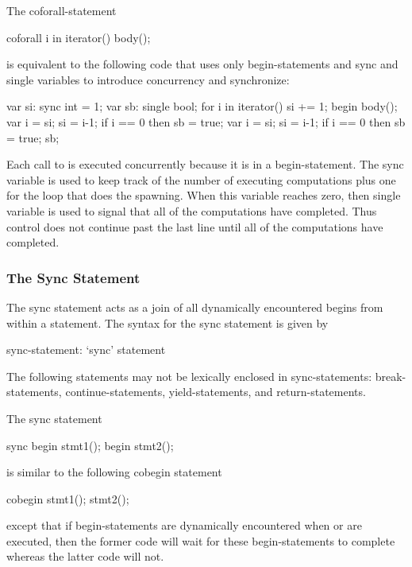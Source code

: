 \begin{example}
The coforall-statement
\begin{chapel}
coforall i in iterator() {
  body();
}
\end{chapel}
is equivalent to the following code that uses only begin-statements
and sync and single variables to introduce concurrency and
synchronize:
\begin{chapel}
var si: sync int = 1;
var sb: single bool;
for i in iterator() {
  si += 1;
  begin {
    body();
    var i = si;
    si = i-1;
    if i == 0 then sb = true;
  }
}
var i = si;
si = i-1;
if i == 0 then sb = true;
sb;
\end{chapel}
Each call to  is executed concurrently because it is in a
begin-statement.  The sync variable  is used to keep track of
the number of executing computations plus one for the loop that does
the spawning.  When this variable reaches zero, then single variable
is used to signal that all of the computations have completed.  Thus
control does not continue past the last line until all of the
computations have completed.
\end{example}

\subsubsection{The Sync Statement}
\label{Sync_Statement}

The sync statement acts as a join of all dynamically encountered
begins from within a statement.  The syntax for the sync statement is
given by
\begin{syntax}
sync-statement:
  `sync' statement
\end{syntax}

The following statements may not be lexically enclosed in
sync-statements: break-statements, continue-statements,
yield-statements, and return-statements.

\begin{example}
The sync statement
\begin{chapel}
sync {
  begin stmt1();
  begin stmt2();
}
\end{chapel}
is similar to the following cobegin statement
\begin{chapel}
cobegin {
  stmt1();
  stmt2();
}
\end{chapel}
except that if begin-statements are dynamically encountered
when  or  are executed, then the former
code will wait for these begin-statements to complete whereas the
latter code will not.
\end{example}

